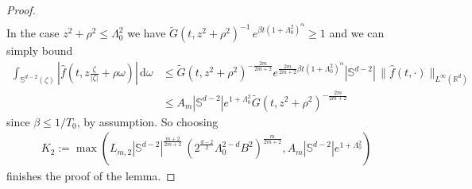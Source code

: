 \documentclass[11pt,a4paper,reqno]{amsart}
\theoremstyle{plain}
\theoremstyle{definition}
\begin{document}
\begin{proof}
\begin{align*}
	\end{align*}
	In the case $z^2+ \rho^2 \leq \Lambda_0^2$ we have $\widetilde{G}(t, z^2+\rho^2)^{-1}\, e^{\beta t (1+\Lambda_0^2)^{\alpha}} \geq 1$ and we can simply bound
	\begin{align*}
		\int_{{\mathbb{S}}^{d-2}(\zeta)} \left|\hat{f}\left(t,z \tfrac{\zeta}{|\zeta|}+\rho\omega\right)\right|\,\mathrm{d}\omega
		&\le
			\widetilde{G}\left(t,z^2+\rho^2\right)^{-\frac{2m}{2m+2}}
			e^{\tfrac{2m}{2m+2}\beta t(1+\Lambda_0^2)^\alpha}
			|{\mathbb{S}}^{d-2}| \, \|\hat{f}(t,\cdot)\|_{L^\infty({\mathbb{R}}^d)} \\
		&\le A_m |{\mathbb{S}}^{d-2}| e^{1+\Lambda_0^2} \widetilde{G}\left(t,z^2+\rho^2\right)^{-\frac{2m}{2m+2}}
	\end{align*}
	since $\beta\le 1/T_0$, by assumption. So choosing
	\begin{align*}
		K_2:= \max\left( L_{m,2}  |{\mathbb{S}}^{d-2}|^{\frac{m+2}{2m+2}}\, \left( 2^{\frac{d-2}{2}} \Lambda_0^{2-d} B^2 \right)^{\frac{m}{2m+2}},  A_m |{\mathbb{S}}^{d-2}| e^{1+\Lambda_0^2}\right)
	\end{align*}
	finishes the proof of the lemma.
\end{proof}
\end{document}
